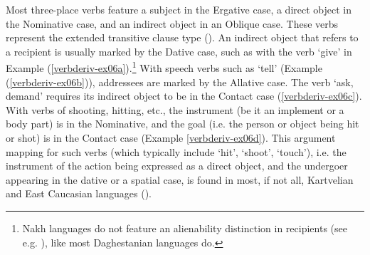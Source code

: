 Most three-place verbs feature a subject in the Ergative case, a direct object in the Nominative case, and an indirect object in an Oblique case. These verbs represent the extended transitive clause type (\cites{dixonaikh2000intro,forker17ergativity}). An indirect object that refers to a recipient is usually marked by the Dative case, such as with the verb `give' in Example (\ref{verbderiv-ex06a}).\footnote{Nakh languages do not feature an alienability distinction in recipients (see e.g. \cites[592]{nichols11}), like most Daghestanian languages do.}
With speech verbs such as `tell' (Example (\ref{verbderiv-ex06b})), addressees are marked by the Allative case. The verb `ask, demand' requires its indirect object to be in the Contact case (\ref{verbderiv-ex06c}). With verbs of shooting, hitting, etc., the instrument (be it an implement or a body part) is in the Nominative, and the goal (i.e. the person or object being hit or shot) is in the Contact case (Example \ref{verbderiv-ex06d}). This argument mapping for such verbs (which typically include `hit', `shoot', `touch'), i.e. the instrument of the action being expressed as a direct object, and the undergoer appearing in the dative or a spatial case, is found in most, if not all, Kartvelian and East Caucasian languages (\cites[58--59]{klimov78struktur}).



